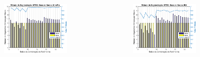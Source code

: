 \documentclass{beamer}
\begin{document}
\begin{frame}
\begin{columns}[c]
			\begin{figure}
				\begin{center}
					\includegraphics[width=0.8\textwidth]{./img/mtd2_nina.eps}
				\end{center}
			\end{figure}
			\begin{figure}
				\begin{center}
					\includegraphics[width=0.8\textwidth]{./img/mtd2_iee.eps}
				\end{center}
			\end{figure}
			
		\end{columns}
	\end{frame}
	
\end{document}
